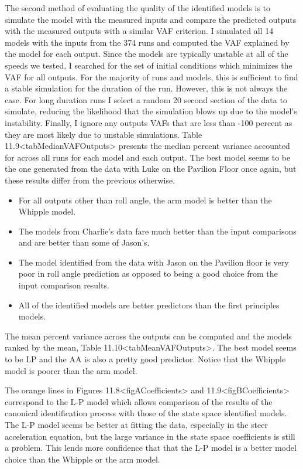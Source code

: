 \documentclass[a4paper]{article}
\begin{document}
The second method of evaluating the quality of the identified models is
to simulate the model with the measured inputs and compare the predicted
outputs with the measured outputs with a similar VAF criterion. I
simulated all 14 models with the inputs from the 374 runs and computed
the VAF explained by the model for each output. Since the models are
typically unstable at all of the speeds we tested, I searched for the
set of initial conditions which minimizes the VAF for all outputs. For
the majority of runs and models, this is sufficient to find a stable
simulation for the duration of the run. However, this is not always the
case. For long duration runs I select a random 20 second section of the
data to simulate, reducing the likelihood that the simulation blows up
due to the model's instability. Finally, I ignore any outputs VAFs that
are less than -100 percent as they are most likely due to unstable
simulations. Table 11.9\textless{}tabMedianVAFOutputs\textgreater{}
presents the median percent variance accounted for across all runs for
each model and each output. The best model seems to be the one generated
from the data with Luke on the Pavilion Floor once again, but these
results differ from the previous otherwise.

\begin{itemize}
  \item
    For all outputs other than roll angle, the arm model is better than
    the Whipple model.
  \item
    The models from Charlie's data fare much better than the input
    comparisons and are better than some of Jason's.
  \item
    The model identified from the data with Jason on the Pavilion floor is
    very poor in roll angle prediction as opposed to being a good choice
    from the input comparison results.
  \item
    All of the identified models are better predictors than the first
    principles models.
\end{itemize}

The mean percent variance across the outputs can be computed and the
models ranked by the mean,
Table 11.10\textless{}tabMeanVAFOutputs\textgreater{}. The best model
seems to be LP and the AA is also a pretty good predictor. Notice that
the Whipple model is poorer than the arm model.

The orange lines in Figures
11.8\textless{}figACoefficients\textgreater{} and
11.9\textless{}figBCoefficients\textgreater{} correspond to the L-P
model which allows comparison of the results of the canonical
identification process with those of the state space identified models.
The L-P model seems be better at fitting the data, especially in the
steer acceleration equation, but the large variance in the state space
coefficients is still a problem. This lends more confidence that that
the L-P model is a better model choice than the Whipple or the arm
model.
\end{document}
